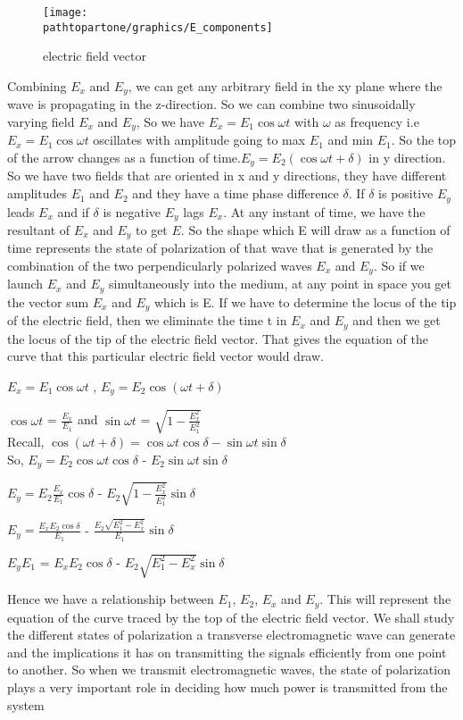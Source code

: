 \begin{figure}[h]
\centering
\texttt{[image: \\pathtopartone/graphics/E\_components]}
\caption{electric field vector}
\label{electric field vector components}
\end{figure}
Combining $E_x$ and $E_y$, we can get any arbitrary field in the xy plane where the wave is propagating in the z-direction. So we can combine two sinusoidally varying field $E_x$ and $E_y$, So we have $E_x = E_{1}\cos\omega t$ with $\omega$ as frequency i.e$ E_x = E_{1}\cos\omega t$ oscillates with amplitude going to max $E_{1}$ and min $E_{1}$. So the top of the arrow changes as a function of time.$ E_y = E_{2}(\cos\omega t + \delta)$ in y direction. So we have two fields that are oriented in x and y directions, they have different amplitudes $E_{1}$ and $E_{2}$ and they have a time phase difference $\delta$. If $\delta$ is positive $E_y$ leads $E_x$ and if $\delta$ is negative $E_y$ lags $E_x$. At any instant of time, we have the resultant of $E_x$ and $E_y$ to get $E$. So the shape which E will draw as a function of time represents the state of polarization of that wave that is generated by the combination of the two perpendicularly polarized waves $E_x$ and $E_y$. So if we launch $E_x$ and $E_y$ simultaneously into the medium, at any point in space you get the vector sum $E_x$ and $E_y$ which is E. If we have to determine the locus of the tip of the electric field, then we eliminate the time t in $E_x$ and $E_y$ and then we get the locus of the tip of the electric field vector. That gives the equation of the curve that this particular electric field vector would draw.

$E_x = E_{1}\cos\omega t$ , $E_y = E_{2}\cos(\omega t + \delta)$

$\cos\omega t$ = $\frac{E_x}{E_1}$ and $\sin\omega t$ = $\sqrt{1 - \frac{E_x^2}{E_{1}^2}}$
\\
Recall, $\cos(\omega t + \delta) = \cos\omega t\cos\delta - \sin\omega t\sin\delta$
\\
So,
$E_y = E_{2}\cos\omega t\cos\delta$ - $E_{2}\sin\omega t\sin\delta$

$E_y = E_{2}\frac{E_x}{E_{1}}\cos\delta$ - $E_{2}\sqrt{1 - \frac{E_x^2}{E_{1}^2}}\sin\delta$

$E_y = \frac{E_xE_{2}\cos\delta}{E_{1}}$ - $\frac{E_{2}\sqrt{E_{1}^2 - E_x^2}}{E_{1}}\sin\delta$

$E_yE_{1}$ = $E_xE_{2}\cos\delta$ - $E_{2}\sqrt{E_{1}^2 - E_x^2}\sin\delta$

Hence we have a relationship between $E_{1}$, $E_{2}$, $E_x$ and $E_y$. This will represent the equation of the curve traced by the top of the electric field vector. We shall study the different states of polarization a transverse electromagnetic wave can generate and the implications it has on transmitting the signals efficiently from one point to another. So when we transmit electromagnetic waves, the state of polarization plays a very important role in deciding how much power is transmitted from the system	
